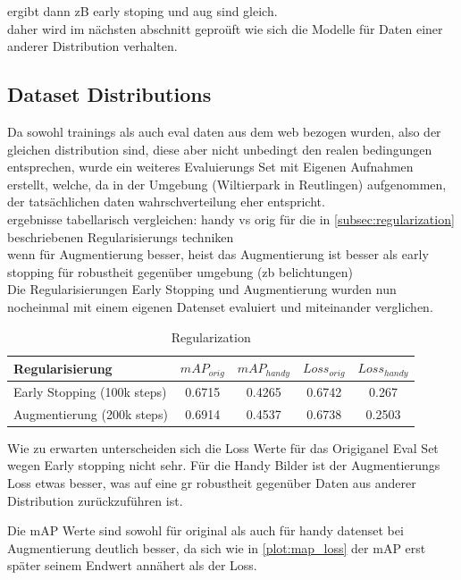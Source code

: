 ergibt dann zB early stoping und aug sind gleich.
\\
daher wird im nächsten abschnitt geproüft wie sich 
die Modelle für Daten einer anderer Distribution verhalten.


\subsection{Dataset Distributions}\label{subsec:distributions}
Da sowohl trainings als auch eval daten aus dem web bezogen wurden,
also der gleichen distribution sind, diese aber nicht unbedingt 
den realen bedingungen entsprechen, wurde ein weiteres Evaluierungs 
Set mit Eigenen Aufnahmen erstellt, welche, da in der Umgebung 
(Wiltierpark in Reutlingen) aufgenommen, der tatsächlichen daten 
wahrschverteilung eher entspricht.
\\
ergebnisse tabellarisch vergleichen: handy vs orig für die in 
\ref{subsec:regularization} beschriebenen Regularisierungs techniken\\
wenn für Augmentierung besser, heist das Augmentierung ist besser als 
early stopping für robustheit gegenüber umgebung (zb belichtungen)
\\
Die Regularisierungen Early Stopping und Augmentierung wurden 
nun nocheinmal mit einem eigenen Datenset evaluiert und miteinander 
verglichen.


\begin{table}[htb]
    \centering
    \label{tab:regularization}
    \begin{tabular}{| l || c | c | c | c |} 
        \hline
        Regularisierung & $mAP_{orig}$ & $mAP_{handy}$ & $Loss_{orig}$ &  $Loss_{handy}$\\
        \hline
        Early Stopping (100k steps) & 0.6715 & 0.4265 & 0.6742 & 0.267\\
        \hline
        Augmentierung (200k steps) & 0.6914 & 0.4537 & 0.6738 & 0.2503\\ %
        \hline
    \end{tabular}        
    \caption{Regularization}
\end{table}

Wie zu erwarten unterscheiden sich die Loss Werte für das Origiganel 
Eval Set wegen Early stopping nicht sehr. Für die Handy Bilder ist 
der Augmentierungs Loss etwas besser, was auf eine gr robustheit 
gegenüber Daten aus anderer Distribution zurückzuführen ist.

Die mAP Werte sind sowohl für original als auch für handy datenset 
bei Augmentierung deutlich besser, da sich wie in \ref{plot:map_loss} 
der mAP erst später seinem Endwert annähert als der Loss.


